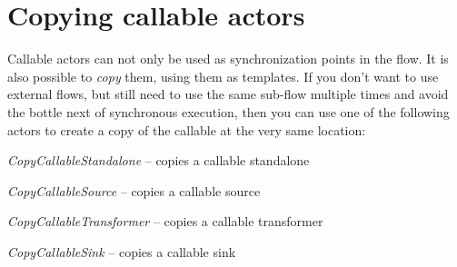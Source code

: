 \documentclass[a4paper]{book}
\begin{document}
\newpage
\chapter{Copying callable actors}
\label{copycallableactors}
Callable actors can not only be used as synchronization points in the flow. It
is also possible to \textit{copy} them, using them as templates. If you don't
want to use external flows, but still need to use the same sub-flow multiple
times and avoid the bottle next of synchronous execution, then you can use
one of the following actors to create a copy of the callable at the very same 
location:
\begin{tight_itemize}
	\item \textit{CopyCallableStandalone} -- copies a callable standalone
	\item \textit{CopyCallableSource} -- copies a callable source
	\item \textit{CopyCallableTransformer} -- copies a callable transformer
	\item \textit{CopyCallableSink} -- copies a callable sink
\end{tight_itemize}



\end{document}
